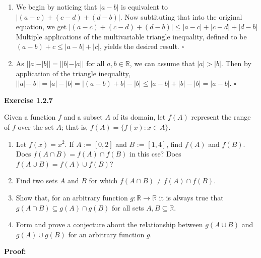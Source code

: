 \documentclass[12 pt]{article}
\newcommand{\qed}[0]{$\square$}
\begin{document}
\begin{enumerate}
\item We begin by noticing that \(|a-b|\) is equivalent to \(|(a-c) + (c-d) + (d-b)|\). Now subtituting that into the original equation, we get \(|(a-c) + (c-d) + (d-b)| \leq |a-c| + |c-d| + |d-b|\) Multiple applications of the multivariable triangle inequality, defined to be \((a-b) + c \leq |a-b| + |c|\), yields the desired result. \qed

\item As \(||a|-|b|| = ||b| - |a||\) for all \(a, b \in \mathbb{R}\), we can assume that \(|a| > |b|\). Then by application of the triangle inequality, \(||a|-|b|| = |a| - |b| = |(a-b) + b| - |b| \leq |a-b| + |b| - |b| = |a-b|\). \qed
\end{enumerate}

\newpage

\textbf{Exercise 1.2.7}

Given a function \(f\) and a subset \(A\) of its domain, let \(f(A)\) represent the range of \(f\) over the set \(A\); that is, \(f(A) = \{f(x) \colon x \in A\}\).

\begin{enumerate}
    \item Let \(f(x) = x^{2}\). If \(A\) := \([0, 2]\) and \(B\) := \([1, 4]\), find \(f(A)\) and \(f(B)\). Does \(f(A \cap B) = f(A) \cap f(B)\) in this cse? Does \(f(A \cup B) = f(A) \cup f(B)\)?
    \item Find two sets \(A\) and \(B\) for which \(f(A \cap B) \neq f(A) \cap f(B)\).
    \item Show that, for an arbitrary function \(g \colon \mathbb{R} \to \mathbb{R}\) it is always true that \(g(A \cap B) \subseteq g(A) \cap g(B)\) for all sets \(A, B \subseteq \mathbb{R}\).
    \item Form and prove a conjecture about the relationship between \(g(A \cup B)\) and \(g(A) \cup g(B)\) for an arbitrary function \(g\).
\end{enumerate}

\vspace{5mm}

\textbf{Proof:}
\end{document}
